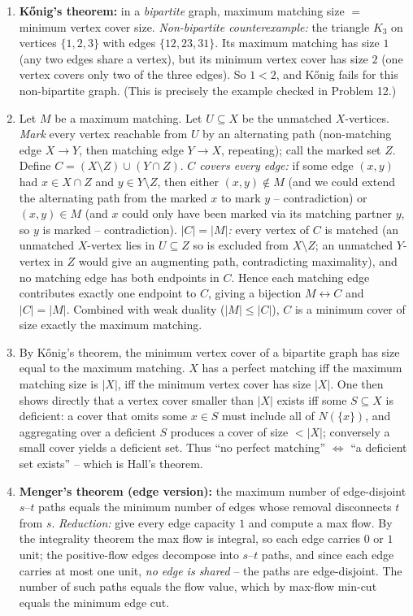 \documentclass[11pt]{article}
\begin{document}
\begin{enumerate}[label=\textbf{A\arabic*.}, leftmargin=2.2em]
\item \textbf{K\H{o}nig's theorem:} in a \emph{bipartite} graph, maximum matching
size $=$ minimum vertex cover size. \emph{Non-bipartite counterexample:} the
triangle $K_3$ on vertices $\{1,2,3\}$ with edges $\{12,23,31\}$. Its maximum
matching has size $1$ (any two edges share a vertex), but its minimum vertex
cover has size $2$ (one vertex covers only two of the three edges). So
$1 < 2$, and K\H{o}nig fails for this non-bipartite graph. (This is precisely the
example checked in Problem 12.)

\item Let $M$ be a maximum matching. Let $U \subseteq X$ be the unmatched
$X$-vertices. \emph{Mark} every vertex reachable from $U$ by an alternating path
(non-matching edge $X\to Y$, then matching edge $Y \to X$, repeating); call the
marked set $Z$. Define $C = (X \setminus Z) \cup (Y \cap Z)$.
\emph{$C$ covers every edge:} if some edge $(x,y)$ had $x \in X \cap Z$ and
$y \in Y \setminus Z$, then either $(x,y) \notin M$ (and we could extend the
alternating path from the marked $x$ to mark $y$ -- contradiction) or $(x,y) \in M$
(and $x$ could only have been marked via its matching partner $y$, so $y$ is
marked -- contradiction). \emph{$|C| = |M|$:} every vertex of $C$ is matched (an
unmatched $X$-vertex lies in $U \subseteq Z$ so is excluded from $X \setminus Z$;
an unmatched $Y$-vertex in $Z$ would give an augmenting path, contradicting
maximality), and no matching edge has both endpoints in $C$. Hence each matching
edge contributes exactly one endpoint to $C$, giving a bijection $M
\leftrightarrow C$ and $|C| = |M|$. Combined with weak duality ($|M| \le |C|$),
$C$ is a minimum cover of size exactly the maximum matching.

\item By K\H{o}nig's theorem, the minimum vertex cover of a bipartite graph has
size equal to the maximum matching. $X$ has a perfect matching iff the maximum
matching size is $|X|$, iff the minimum vertex cover has size $|X|$. One then
shows directly that a vertex cover smaller than $|X|$ exists iff some $S
\subseteq X$ is deficient: a cover that omits some $x \in S$ must include all of
$N(\{x\})$, and aggregating over a deficient $S$ produces a cover of size
$< |X|$; conversely a small cover yields a deficient set. Thus ``no perfect
matching'' $\iff$ ``a deficient set exists'' -- which is Hall's theorem.

\item \textbf{Menger's theorem (edge version):} the maximum number of
edge-disjoint $s$--$t$ paths equals the minimum number of edges whose removal
disconnects $t$ from $s$. \emph{Reduction:} give every edge capacity $1$ and
compute a max flow. By the integrality theorem the max flow is integral, so each
edge carries $0$ or $1$ unit; the positive-flow edges decompose into $s$--$t$
paths, and since each edge carries at most one unit, \emph{no edge is shared} --
the paths are edge-disjoint. The number of such paths equals the flow value,
which by max-flow min-cut equals the minimum edge cut.


\end{enumerate}
\end{document}
